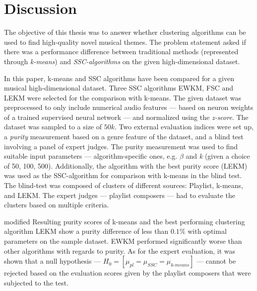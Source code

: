 \documentclass[../report.tex]{subfiles}
\begin{document}
\chapter{Discussion}
The objective of this thesis was to answer whether clustering algorithms can be used to find high-quality novel musical themes. The problem statement asked if there was a performance difference between traditional methods (represented through \textit{k-means}) and \textit{SSC-algorithms} on the given high-dimensional dataset.

In this paper, k-means and SSC algorithms have been compared for a given musical high-dimensional dataset. Three SSC algorithms EWKM, FSC and LEKM
were selected for the comparison with k-means. The given dataset was preprocessed to only include numerical audio features  --- based on neuron weights of a trained supervised neural network --- and normalized using the \textit{z-score}. The dataset was sampled to a size of $50k$. Two external evaluation indices were set up, a \textit{purity} measurement based on a genre feature of the dataset, and a blind test involving a panel of expert judges. The purity measurement was used to find suitable input parameters --- algorithm-specific ones, e.g. $\beta$ and \textit{k} (given a choice of 50, 100, 500). Additionally, the algorithm with the best purity score (LEKM) was used as the SSC-algorithm for comparison with k-means in the blind test. The blind-test was composed of clusters of different sources: Playlist, k-means, and LEKM. The expert judges --- playlist composers --- had to evaluate the clusters based on multiple criteria.

\begin{color}{modified}
Resulting purity scores of k-means and the best performing clustering algorithm LEKM show a purity difference of less than $0.1\%$ with optimal parameters on the sample dataset. EWKM performed significantly worse than other algorithms with regards to purity. As for the expert evaluation, it was shown that a null hypothesis --- $H_0 = [ \mu_{\textit{pl}} = \mu_{\textit{SSC}} = \mu_{\textit{k-means}} ]$ --- cannot be rejected based on the evaluation scores given by the playlist composers that were subjected to the test.
\end{color}

\end{document}
